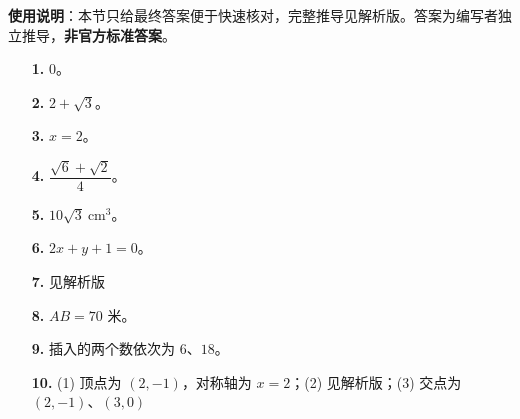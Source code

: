 
\begin{gknotice}
\textbf{使用说明}：本节只给最终答案便于快速核对，完整推导见解析版。答案为编写者独立推导，\textbf{非官方标准答案}。
\end{gknotice}

\begin{itemize}[leftmargin=2.6em]
  \item[\textbf{1.}] $0$。
  \item[\textbf{2.}] $2+\sqrt3$。
  \item[\textbf{3.}] $x=2$。
  \item[\textbf{4.}] $\dfrac{\sqrt6+\sqrt2}{4}$。
  \item[\textbf{5.}] $10\sqrt3\ \mathrm{cm^3}$。
  \item[\textbf{6.}] $2x+y+1=0$。
  \item[\textbf{7.}] 见解析版
  \item[\textbf{8.}] $AB=70$ 米。
  \item[\textbf{9.}] 插入的两个数依次为 $6$、$18$。
  \item[\textbf{10.}] (1) 顶点为 $(2,-1)$，对称轴为 $x=2$；(2) 见解析版；(3) 交点为 $(2,-1)$、$(3,0)$
\end{itemize}

